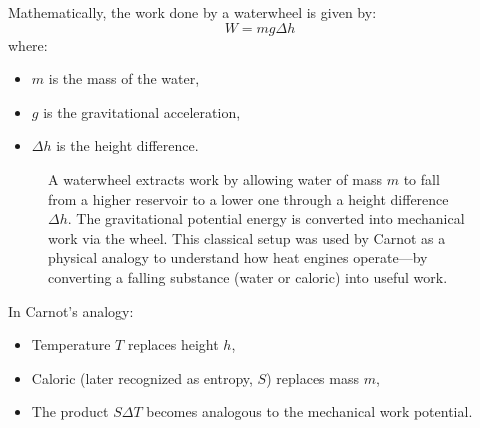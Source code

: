 Mathematically, the work done by a waterwheel is given by:
\[
W = mg \Delta h
\]
where:
\begin{itemize}
  \item \( m \) is the mass of the water,
  \item \( g \) is the gravitational acceleration,
  \item \( \Delta h \) is the height difference.
\end{itemize}



\begin{figure}[H]
\centering
{}
\caption{
A waterwheel extracts work by allowing water of mass \( m \) to fall from a higher reservoir to a lower one through a height difference \( \Delta h \). The gravitational potential energy is converted into mechanical work via the wheel. This classical setup was used by Carnot as a physical analogy to understand how heat engines operate—by converting a falling substance (water or caloric) into useful work.
}
\end{figure}





In Carnot’s analogy:
\begin{itemize}
  \item Temperature \( T \) replaces height \( h \),
  \item Caloric (later recognized as entropy, \( S \)) replaces mass \( m \),
  \item The product \( S \Delta T \) becomes analogous to the mechanical work potential.
\end{itemize}

